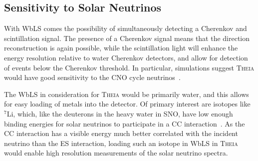 \subsection{Sensitivity to Solar Neutrinos}
With WbLS comes the possibility of simultaneously detecting a Cherenkov and scintillation signal.
The presence of a Cherenkov signal means that the direction reconstruction is again possible, while the scintillation light will enhance the energy resolution relative to water Cherenkov detectors, and allow for detection of events below the Cherenkov threshold.
In particular, simulations suggest \textsc{Theia} would have good sensitivity to the CNO cycle neutrinos~\cite{theia_solar}.

The WbLS in consideration for \textsc{Theia} would be primarily water, and this allows for easy loading of metals into the detector.
Of primary interest are isotopes like $^7$Li, which, like the deuterons in the heavy water in SNO, have low enough binding energies for solar neutrinos to participate in a CC interaction~\cite{asdc_paper}.
As the CC interaction has a visible energy much better correlated with the incident neutrino than the ES interaction, loading such an isotope in WbLS in \textsc{Theia} would enable high resolution measurements of the solar neutrino spectra. 



